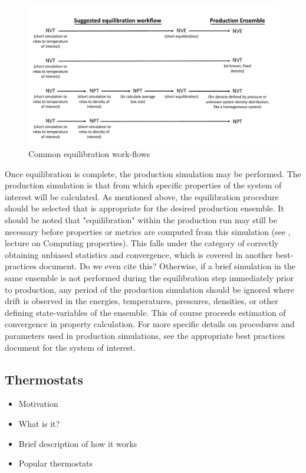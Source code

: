 \documentclass[9pt,bestpractices]{livecoms}
\begin{document}
\begin{figure}[h]
\centering
\includegraphics[width=\linewidth]{Equilibration_Workflow.pdf}
\caption{Common equilibration work-flows}
\label{eqworkflow}
\end{figure}

Once equilibration is complete, the production simulation may be performed.  The
production simulation is that from which specific properties of the system of
interest will be calculated.  As mentioned above, the equilibration procedure
should be selected that is appropriate for the desired production ensemble.  It
should be noted that "equilibration" within the production run may still be
necessary before properties or metrics are computed from this simulation (see
\citet{ShellNotes}, lecture on Computing properties).
This falls under the category of correctly obtaining unbiased statistics and
convergence, which is covered in another best-practices document. %
Do we even cite this?
Otherwise, if a brief simulation in the same ensemble is not performed during
the equilibration step immediately prior to production, any period of the
production simulation should be ignored where drift is observed in the energies,
temperatures, pressures, densities, or other defining state-variables of the
ensemble.  This of course proceeds estimation of convergence in property
calculation.  For more specific details on procedures and parameters used in
production simulations, see the appropriate best practices document for the
system of interest.

\subsection{Thermostats}
\begin{itemize}
\item Motivation
\item What is it?
\item Brief description of how it works
\item Popular thermostats
\end{itemize}
\end{document}

